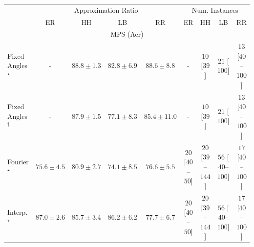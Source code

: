 \begin{tabular}{l|cccc|cccc|}
\toprule
& \multicolumn{4}{c|}{Approximation Ratio} & \multicolumn{4}{c|}{Num. Instances} \\
            & ER & HH & LB & RR & ER & HH & LB & RR \\
\midrule
\multicolumn{9}{c}{\rule{0pt}{8pt}MPS (Aer)} \\
\midrule
Fixed Angles$^\star$ & {\cellcolor[HTML]{000000}} \color[HTML]{F1F1F1} {\cellcolor{white}} \color{black} - & {\cellcolor[HTML]{790D75}} \color[HTML]{F1F1F1} $88.8\pm 1.3$ & {\cellcolor[HTML]{88419D}} \color[HTML]{F1F1F1} $82.8\pm 6.9$ & {\cellcolor[HTML]{7B0D76}} \color[HTML]{F1F1F1} $88.6\pm 8.8$ & {\cellcolor[HTML]{000000}} \color[HTML]{F1F1F1} {\cellcolor{white}} \color{black} - & {\cellcolor[HTML]{FFF7F3}} \color[HTML]{000000} $10$ [$39$] & {\cellcolor[HTML]{FFF4F0}} \color[HTML]{000000} $21$ [$100$] & {\cellcolor[HTML]{FFF6F2}} \color[HTML]{000000} $13$ [$40$--$100$] \\
Fixed Angles$^\dagger$ & {\cellcolor[HTML]{000000}} \color[HTML]{F1F1F1} {\cellcolor{white}} \color{black} - & {\cellcolor[HTML]{81117D}} \color[HTML]{F1F1F1} $87.9\pm 1.5$ & {\cellcolor[HTML]{8C6EB3}} \color[HTML]{F1F1F1} $77.1\pm 8.3$ & {\cellcolor[HTML]{85288D}} \color[HTML]{F1F1F1} $85.4\pm 11.0$ & {\cellcolor[HTML]{000000}} \color[HTML]{F1F1F1} {\cellcolor{white}} \color{black} - & {\cellcolor[HTML]{FFF7F3}} \color[HTML]{000000} $10$ [$39$] & {\cellcolor[HTML]{FFF4F0}} \color[HTML]{000000} $21$ [$100$] & {\cellcolor[HTML]{FFF6F2}} \color[HTML]{000000} $13$ [$40$--$100$] \\
Fourier$^\star$ & {\cellcolor[HTML]{8C7AB8}} \color[HTML]{F1F1F1} $75.6\pm 4.5$ & {\cellcolor[HTML]{8950A4}} \color[HTML]{F1F1F1} $80.9\pm 2.7$ & {\cellcolor[HTML]{8C86BE}} \color[HTML]{F1F1F1} $74.1\pm 8.5$ & {\cellcolor[HTML]{8C72B5}} \color[HTML]{F1F1F1} $76.6\pm 5.5$ & {\cellcolor[HTML]{FFF4F0}} \color[HTML]{000000} $20$ [$40$--$50$] & {\cellcolor[HTML]{FFF4F0}} \color[HTML]{000000} $20$ [$39$--$144$] & {\cellcolor[HTML]{FEECE9}} \color[HTML]{000000} $56$ [$40$--$100$] & {\cellcolor[HTML]{FFF5F1}} \color[HTML]{000000} $17$ [$40$--$100$] \\
Interp.$^\star$ & {\cellcolor[HTML]{821982}} \color[HTML]{F1F1F1} $87.0\pm 2.6$ & {\cellcolor[HTML]{84258B}} \color[HTML]{F1F1F1} $85.7\pm 3.4$ & {\cellcolor[HTML]{832088}} \color[HTML]{F1F1F1} $86.2\pm 6.2$ & {\cellcolor[HTML]{8C69B0}} \color[HTML]{F1F1F1} $77.7\pm 6.7$ & {\cellcolor[HTML]{FFF4F0}} \color[HTML]{000000} $20$ [$40$--$50$] & {\cellcolor[HTML]{FFF4F0}} \color[HTML]{000000} $20$ [$39$--$144$] & {\cellcolor[HTML]{FEECE9}} \color[HTML]{000000} $56$ [$40$--$100$] & {\cellcolor[HTML]{FFF5F1}} \color[HTML]{000000} $17$ [$40$--$100$] \\

\end{tabular}
